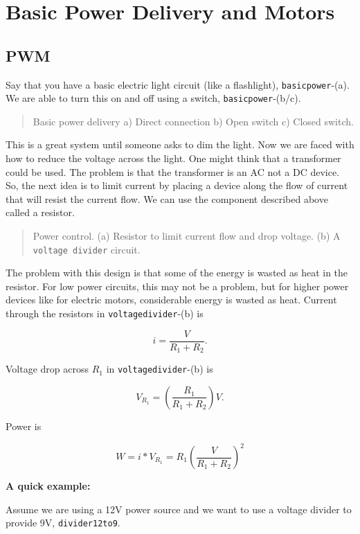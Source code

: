 \hypertarget{basic-power-delivery-and-motors}{%
\section{Basic Power Delivery and
Motors}\label{basic-power-delivery-and-motors}}

\hypertarget{pwm}{%
\subsection{PWM}\label{pwm}}

Say that you have a basic electric light circuit (like a flashlight),
\texttt{basicpower}-(a). We are able to turn this on and off using a
switch, \texttt{basicpower}-(b/c).

\begin{quote}
Basic power delivery a) Direct connection b) Open switch c) Closed
switch.
\end{quote}

This is a great system until someone asks to dim the light. Now we are
faced with how to reduce the voltage across the light. One might think
that a transformer could be used. The problem is that the transformer is
an AC not a DC device. So, the next idea is to limit current by placing
a device along the flow of current that will resist the current flow. We
can use the component described above called a resistor.

\begin{quote}
Power control. (a) Resistor to limit current flow and drop voltage. (b)
A \texttt{voltage\ divider} circuit.
\end{quote}

The problem with this design is that some of the energy is wasted as
heat in the resistor. For low power circuits, this may not be a problem,
but for higher power devices like for electric motors, considerable
energy is wasted as heat. Current through the resistors in
\texttt{voltagedivider}-(b) is

\[\displaystyle i = \frac{V}{R_1+R_2}.\]

Voltage drop across \(R_1\) in \texttt{voltagedivider}-(b) is

\[\displaystyle V_{R_1} = \left(\frac{R_1}{R_1+R_2}\right)V .\]

Power is

\[\displaystyle W = i*V_{R_1} = R_1\left(\frac{V}{R_1+R_2}\right)^2\]

\textbf{A quick example:}

Assume we are using a 12V power source and we want to use a voltage
divider to provide 9V, \texttt{divider12to9}.

